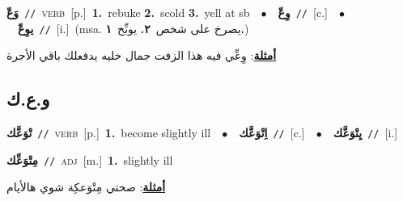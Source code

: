 \documentclass[10pt,a4paper,twoside]{article} %
\begin{document}
\begin{multicols}{2}
{\setlength\topsep{0pt}\textbf{\foreignlanguage{arabic}{وَعّ}}\ {\color{gray}\texttt{//}\color{black}}\ \textsc{verb}\ [p.]\ \textbf{1.}~rebuke  \textbf{2.}~scold  \textbf{3.}~yell at sb\ \ $\bullet$\ \ \setlength\topsep{0pt}\textbf{\foreignlanguage{arabic}{وِعّ}}\ {\color{gray}\texttt{//}\color{black}}\ [c.]\ \ $\bullet$\ \ \setlength\topsep{0pt}\textbf{\foreignlanguage{arabic}{يوِعّ}}\ {\color{gray}\texttt{//}\color{black}}\ [i.]\ \color{gray}(msa. \foreignlanguage{arabic}{يصرخ على شخص}~\foreignlanguage{arabic}{\textbf{٢.}}  \foreignlanguage{arabic}{يوبِّخ}~\foreignlanguage{arabic}{\textbf{١.}})\color{black}\  \begin{flushright}\color{gray}\foreignlanguage{arabic}{\textbf{\underline{\foreignlanguage{arabic}{أمثلة}}}: وِعِّي فيه هذا الزفت جمال خليه يدفعلك باقي الأجرة}\end{flushright}\color{black}} \vspace{2mm}

\vspace{-3mm}
\subsection*{\color{blue}\foreignlanguage{arabic}{و.ع.ك}\color{blue}{}} 

{\setlength\topsep{0pt}\textbf{\foreignlanguage{arabic}{تْوَعَّك}}\ {\color{gray}\texttt{//}\color{black}}\ \textsc{verb}\ [p.]\ \textbf{1.}~become slightly ill\ \ $\bullet$\ \ \setlength\topsep{0pt}\textbf{\foreignlanguage{arabic}{اِتْوَعَّك}}\ {\color{gray}\texttt{//}\color{black}}\ [c.]\ \ $\bullet$\ \ \setlength\topsep{0pt}\textbf{\foreignlanguage{arabic}{يِتْوَعَّك}}\ {\color{gray}\texttt{//}\color{black}}\ [i.]\ } \vspace{2mm}

{\setlength\topsep{0pt}\textbf{\foreignlanguage{arabic}{مِتْوَعِّك}}\ {\color{gray}\texttt{//}\color{black}}\ \textsc{adj}\ [m.]\ \textbf{1.}~slightly ill\  \begin{flushright}\color{gray}\foreignlanguage{arabic}{\textbf{\underline{\foreignlanguage{arabic}{أمثلة}}}: صحتي مِتْوَعكِة شوي هالأيام}\end{flushright}\color{black}} \vspace{2mm}


\end{multicols}
\end{document}
